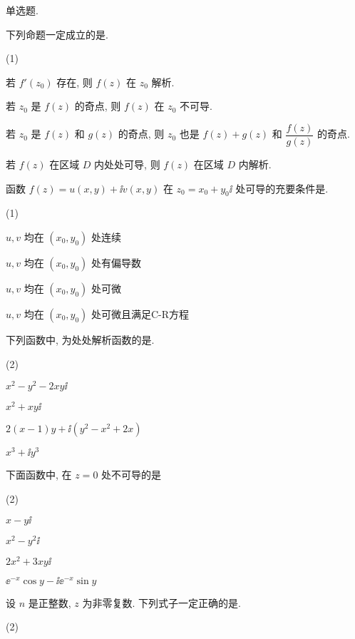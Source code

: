 \begin{homework}
  \item 单选题.
  \begin{homework}
    \item 下列命题一定成立的是\fillbrace{}.
    \begin{exchoice}(1)
      \item 若 $f'(z_0)$ 存在, 则 $f(z)$ 在 $z_0$ 解析.
      \item 若 $z_0$ 是 $f(z)$ 的奇点, 则 $f(z)$ 在 $z_0$ 不可导.
      \item 若 $z_0$ 是 $f(z)$ 和 $g(z)$ 的奇点, 则 $z_0$ 也是 $f(z)+g(z)$ 和 $\dfrac{f(z)}{g(z)}$ 的奇点.
      \item 若 $f(z)$ 在区域 $D$ 内处处可导, 则 $f(z)$ 在区域 $D$ 内解析.
    \end{exchoice}
    \item 函数 $f(z)=u(x,y)+\ii v(x,y)$ 在 $z_0=x_0+y_0\ii$ 处可导的充要条件是\fillbrace{}.
    \begin{exchoice}(1)
      \item $u,v$ 均在 $(x_0,y_0)$ 处连续
      \item $u,v$ 均在 $(x_0,y_0)$ 处有偏导数
      \item $u,v$ 均在 $(x_0,y_0)$ 处可微
      \item $u,v$ 均在 $(x_0,y_0)$ 处可微且满足C-R方程
    \end{exchoice}
    \item 下列函数中, 为处处解析函数的是\fillbrace{}.
    \begin{exchoice}(2)
      \item $x^2-y^2-2xy\ii$
      \item $x^2+xy\ii$
      \item $2(x-1)y+\ii(y^2-x^2+2x)$
      \item $x^3+\ii y^3$
    \end{exchoice}
    \item 下面函数中, 在 $z=0$ 处不可导的是\fillbrace{}
    \begin{exchoice}(2)
      \item $x-y\ii$
      \item $x^2-y^2\ii$
      \item $2x^2+3xy\ii$
      \item $\ee^{-x}\cos y-\ii \ee^{-x}\sin y$
    \end{exchoice}
    \item 设 $n$ 是正整数, $z$ 为非零复数. 下列式子一定正确的是\fillbrace{}.
    \begin{exchoice}(2)

\end{exchoice}
\end{homework}
\end{homework}
